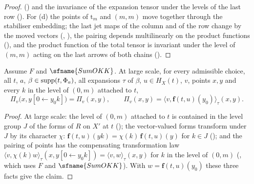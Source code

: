 \begin{proof}
() and the invariance of the expansion tensor under the levels of
the last row (). For (d) the points of $\mathrm t_m$ and $(m,m)$
move together through the stabiliser embedding; the last jet maps of the column and of the row change by the moved vectors
(, ), the pairing depends
multilinearly on the product functions (), and the product function of the
total tensor is invariant under the level of $(m,m)$ acting on the last arrows of both chains
().
\end{proof}

\begin{proposition}\label{pf:rowprops:firstrow}
Assume $F$ and $\sfname{SumOKK}$. At large scale, for every admissible choice, all $t$, $a$, $\beta\in\mathrm{supp}(t,\Phi_a)$, all
expansions $\tau$ of $\beta$, $u\in H_X(t)$, $v$, points $x,y$ and every $k$ in the level of $(0,m)$ attached to $t$,
\[
\Pi_v\bigl(x,y[0\leftarrow y_0k]\bigr)=\Pi_v(x,y),\qquad
\Pi_v(x,y)=\bigl\langle v,\mathbf{f}(t,u)(y_0)\bigr\rangle_\tau(x,y).
\]
\end{proposition}

\begin{proof}
At large scale: the level of $(0,m)$ attached to $t$ is contained in the level group $J$ of the forms of $R$ on $X'$ at $t$
(); the vector-valued forms transform under $J$ by its
character $\chi$: $\mathbf{f}(t,u)(yk)=\chi(k)\,\mathbf{f}(t,u)(y)$ for $k\in J$
(); and the pairing of points has the compensating transformation law
$\langle v,\chi(k)w\rangle_\tau(x,y[0\leftarrow y_0k])=\langle v,w\rangle_\tau(x,y)$ for $k$ in the level of $(0,m)$
(, which uses $F$ and $\sfname{SumOKK}$). With $w=\mathbf{f}(t,u)(y_0)$
these three facts give the claim.
\end{proof}

